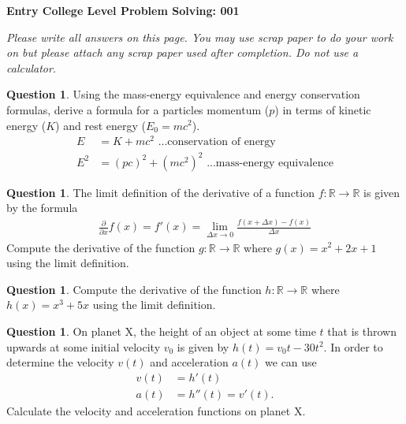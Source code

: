 \documentclass[12pt]{article}
\theoremstyle{definition}
\newtheorem{question}[thm]{Question}
\def\real{{\mathbb R}}
\begin{document}
	\begin{center}
	{\LARGE \textbf{Entry College Level Problem Solving: 001}}\\
		\vspace{.6cm}
	\end{center}
	\begin{center}
		\textit{Please write all answers on this page. You may use scrap paper to do your work on but please attach any scrap paper used after completion. Do not use a calculator.}
	\end{center}
	
\begin{question}
	Using the mass-energy equivalence and energy conservation formulas, derive a formula for a
	particles momentum ($p$) in terms of kinetic energy ($K$) and rest energy ($E_0 = mc^2$).
	\begin{align}
	E&=K+mc^2 \textrm{ ...conservation of energy} \\
	E^2 &= (pc)^2+(mc^2)^2 \textrm{ ...mass-energy equivalence}
	\end{align}	
\end{question}

\vspace{4 cm}

\begin{question}	
The limit definition of the derivative of a function $f: \real \rightarrow \real$ is given by the formula
\begin{align}
\frac{\partial}{\partial x}f(x) = f'(x)= \lim\limits_{\Delta x \rightarrow 0} \frac{f(x+\Delta x)-f(x)}{\Delta x}
\end{align}
Compute the derivative of the function $g: \real \rightarrow \real$ where $g(x)=x^2+2x+1$ using the limit definition.
\end{question}

\vspace{4 cm}

\begin{question}
	Compute the derivative of the function $h: \real \rightarrow \real$ where $h(x)=x^3+5x$ using the limit definition.
\end{question}

\vspace{3cm}


\begin{question}
	On planet X, the height of an object at some time $t$ that is thrown upwards at some initial velocity $v_0$ is given by $h(t)=v_0t-30t^2$. In order to determine the velocity $v(t)$ and acceleration $a(t)$ we can use
	\begin{align}
	v(t)&=h'(t) \\
	a(t)&=h''(t) = v'(t).
	\end{align}
	Calculate the velocity and acceleration functions on planet X.
\end{question}
\end{document}
